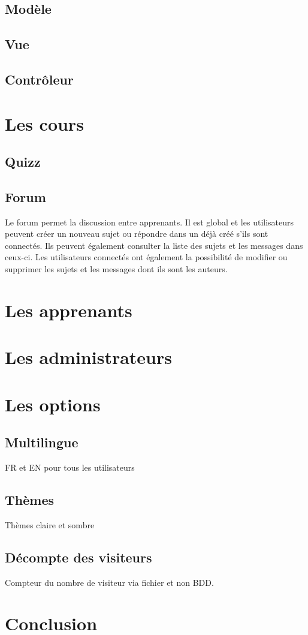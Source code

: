 \documentclass[a4paper,10pt]{article}
\begin{document}
\subsection{Modèle}
\subsection{Vue}
\subsection{Contrôleur}

\section{Les cours}
\subsection{Quizz}
\subsection{Forum}
Le forum permet la discussion entre apprenants. Il est global et les utilisateurs peuvent créer un nouveau sujet ou répondre dans un déjà créé s'ils sont connectés. Ils peuvent également consulter la liste des sujets et les messages dans ceux-ci. Les utilisateurs connectés ont également la possibilité de modifier ou supprimer les sujets et les messages dont ils sont les auteurs.

\section{Les apprenants}

\section{Les administrateurs}


\section{Les options}
\subsection{Multilingue}
FR et EN pour tous les utilisateurs 

\subsection{Thèmes}
Thèmes claire et sombre

\subsection{Décompte des visiteurs}
Compteur du nombre de visiteur via fichier et non BDD.

\section{Conclusion}
\end{document}
